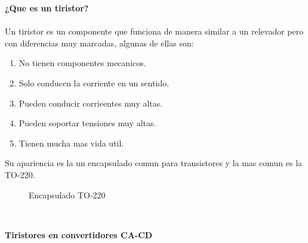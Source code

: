 \documentclass[letterpaper]{article}
\begin{document}
    \begin{large}
        \textbf{¿Que es un tiristor?}\\\\
        Un tiristor es un componente que funciona de manera similar a un relevador pero con diferencias muy marcadas, algunas de ellas son:
        \begin{enumerate}
            \item No tienen componentes mecanicos.
            \item Solo conducen la corriente en un sentido.
            \item Pueden conducir corrieentes muy altas.
            \item Pueden soportar tensiones muy altas.
            \item Tienen mucha mas vida util.
            \newline
        \end{enumerate}
        Su apariencia es la un encapsulado comun para transistores y la mas comun es la TO-220.
        \begin{figure}[htbp]
            \centering
            \caption{Encapsulado TO-220}
            \label{fig:my_label}
        \end{figure}\\
        \begin{large}
            \textbf{Tiristores en convertidores CA-CD}\\\\

\end{large}
\end{large}
\end{document}
